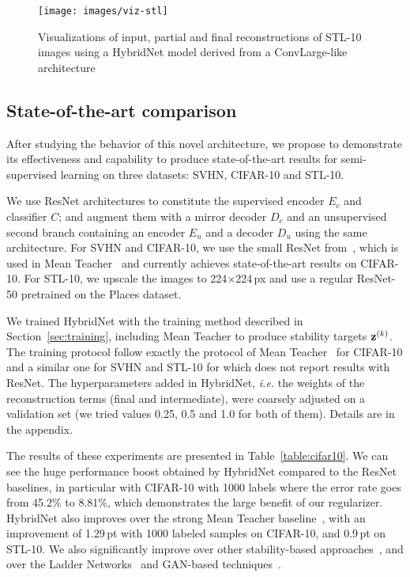 \documentclass[runningheads]{llncs}
\begin{document}
\begin{figure}[tb]
	\centering
	\texttt{[image: images/viz-stl]}
    \caption{Visualizations of input, partial and final reconstructions of STL-10 images using a HybridNet model derived from a ConvLarge-like architecture}
    \label{fig:viz-stl}
\end{figure}

\subsection{State-of-the-art comparison}
\label{sec:cifar10sota}

After studying the behavior of this novel architecture, we propose to demonstrate its effectiveness and capability to produce state-of-the-art results for semi-supervised learning on three datasets: SVHN, CIFAR-10 and STL-10.

We use ResNet architectures to constitute the supervised encoder $E_c$ and classifier $C$; and augment them with a mirror decoder $D_c$ and an unsupervised second branch containing an encoder $E_u$ and a decoder $D_u$ using the same architecture. For SVHN and CIFAR-10, we use the small ResNet from~\cite{Gastaldi2017}, which is used in Mean Teacher~\cite{Tarvainen2017} and currently achieves state-of-the-art results on CIFAR-10. For STL-10, we upscale the images to 224$\times$224\,px and use a regular ResNet-50 pretrained on the Places dataset.

We trained HybridNet with the training method described in Section~\ref{sec:training}, including Mean Teacher to produce stability targets $\mathbf{z}^{(k)}$. The training protocol follow exactly the protocol of Mean Teacher~\cite{Tarvainen2017} for CIFAR-10 and a similar one for SVHN and STL-10 for which \cite{Tarvainen2017} does not report results with ResNet. The hyperparameters added in HybridNet, \textit{i.e.} the weights of the reconstruction terms (final and intermediate), were coarsely adjusted on a validation set (we tried values 0.25, 0.5 and 1.0 for both of them). Details are in the appendix.

The results of these experiments are presented in Table~\ref{table:cifar10}.
We can see the huge performance boost obtained by HybridNet compared to the ResNet baselines, in particular with CIFAR-10 with 1000 labels where the error rate goes from 45.2\% to 8.81\%, which demonstrates the large benefit of our regularizer. HybridNet also improves over the strong Mean Teacher baseline~\cite{Tarvainen2017}, with an improvement of 1.29\,pt with 1000 labeled samples on CIFAR-10, and 0.9\,pt on STL-10. We also significantly improve over other stability-based approaches~\cite{Sajjadi2016,Laine2016}, and over the Ladder Networks~\cite{Rasmus2015} and GAN-based techniques~\cite{Springenberg2015,Salimans2016}.
\end{document}
